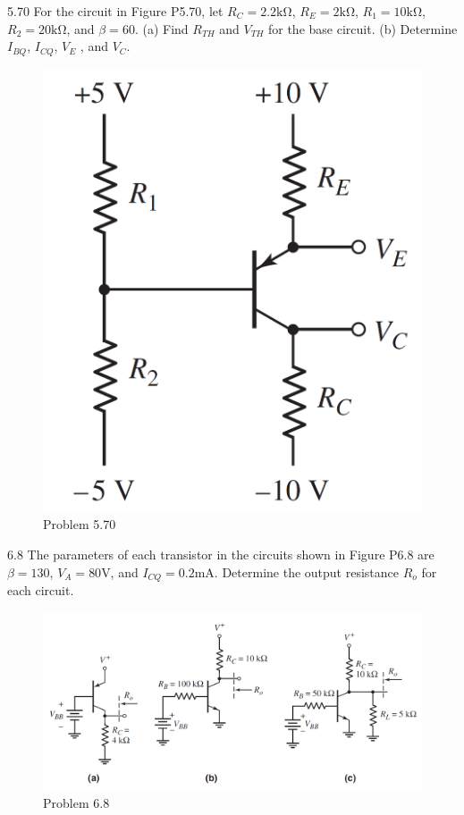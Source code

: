 \documentclass[a4paper,11pt,UTF8]{article}
\begin{document}
5.70 For the circuit in Figure P5.70, let $R_C = 2.2 \mathrm{k\Omega}$, $R_E = 2 \mathrm{k\Omega}$, $R_1 = 10 \mathrm{k\Omega}$,
$R_2 = 20 \mathrm{k\Omega}$, and $\beta = 60$. (a) Find $R_{T H}$ and $V_{T H}$ for the base circuit.
(b) Determine $I_{BQ}$, $I_{CQ}$, $V_E$ , and $V_C$.
\begin{figure}[H] 
	\centering 
	\includegraphics[scale=0.15]{MD5.70.png}
	\caption{Problem 5.70}
\end{figure}
6.8 The parameters of each transistor in the circuits shown in Figure P6.8 are
$\beta = 130$, $V_A = 80 $V, and $I_{CQ} = 0.2 $mA. Determine the output resistance
$R_o$ for each circuit.
\begin{figure}[H] 
	\centering 
	\includegraphics[scale=0.3]{MD6.8.png}
	\caption{Problem 6.8}
\end{figure}
\end{document}
